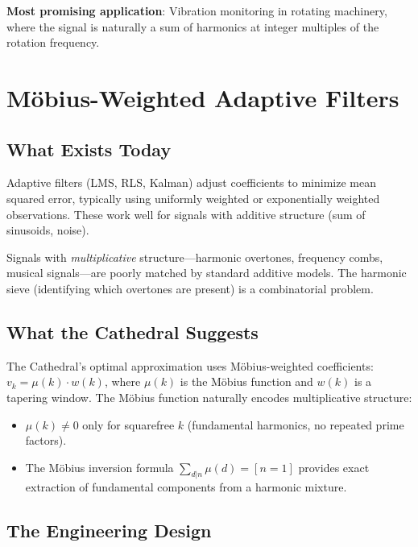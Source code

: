 \documentclass[11pt,a4paper]{article}
\begin{document}
\textbf{Most promising application}: Vibration monitoring in
rotating machinery, where the signal is naturally a sum of harmonics
at integer multiples of the rotation frequency.

\section{M\"obius-Weighted Adaptive Filters}
\label{sec:filters}

\subsection{What Exists Today}

Adaptive filters (LMS, RLS, Kalman) adjust coefficients to minimize
mean squared error, typically using uniformly weighted or
exponentially weighted observations. These work well for signals
with additive structure (sum of sinusoids, noise).

Signals with \emph{multiplicative} structure---harmonic overtones,
frequency combs, musical signals---are poorly matched by standard
additive models. The harmonic sieve (identifying which overtones
are present) is a combinatorial problem.

\subsection{What the Cathedral Suggests}

The Cathedral's optimal approximation uses M\"obius-weighted
coefficients: $v_k = \mu(k) \cdot w(k)$, where $\mu(k)$ is the
M\"obius function and $w(k)$ is a tapering window. The M\"obius
function naturally encodes multiplicative structure:
\begin{itemize}
  \item $\mu(k) \neq 0$ only for squarefree $k$ (fundamental
    harmonics, no repeated prime factors).
  \item The M\"obius inversion formula $\sum_{d|n} \mu(d) = [n=1]$
    provides exact extraction of fundamental components from a
    harmonic mixture.
\end{itemize}

\subsection{The Engineering Design}
\end{document}
